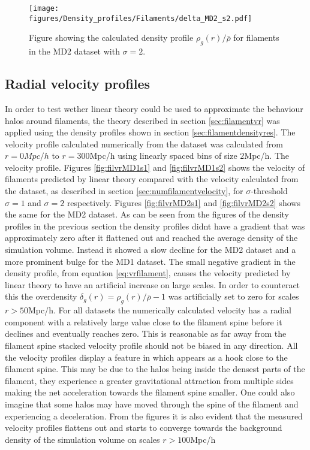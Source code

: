 \begin{figure}[H]
    \texttt{[image: figures/Density\_profiles/Filaments/delta\_MD2\_s2.pdf]}
    \caption{Figure showing the calculated density profile $\rho_g(r)/\bar{\rho}$ for filaments in the MD2 dataset with $\sigma=2$.}
    \label{fig:fildensitytMD2s2}
\end{figure}
\subsection{Radial velocity profiles}
In order to test wether linear theory could be used to approximate the behaviour halos around filaments, the theory described in section \ref{sec:filamentvr} was applied using the density profiles shown in section \ref{sec:filamentdensityres}. The velocity profile calculated numerically from the dataset was calculated from $r=0Mpc/h$ to $r=300$Mpc/h using linearly spaced bins of size $2$Mpc/h. The velocity profile. Figures \ref{fig:filvrMD1s1} and \ref{fig:filvrMD1s2} shows the velocity of filaments predicted by linear theory compared with the velocity calculated from the dataset, as described in section \ref{sec:numfilamentvelocity}, for $\sigma$-threshold $\sigma=1$ and $\sigma=2$ respectively. Figures \ref{fig:filvrMD2s1} and \ref{fig:filvrMD2s2} shows the same for the MD2 dataset. As can be seen from the figures of the density profiles in the previous section the density profiles didnt have a gradient that was approximately zero after it flattened out and reached the average density of the simulation volume. Instead it showed a slow decline for the MD2 dataset and a more prominent bulge for the MD1 dataset. The small negative gradient in the density profile, from equation \ref{eq:vrfilament}, causes the velocity predicted by linear theory to have an artificial increase on large scales. In order to counteract this the overdensity $\delta_g(r)=\rho_g(r)/\bar{\rho}-1$ was artificially set to zero for scales $r>50$Mpc/h. For all datasets the numerically calculated velocity has a radial component with a relatively large value close to the filament spine before it declines and eventually reaches zero. This is reasonable as far away from the filament spine stacked velocity profile should not be biased in any direction. All the velocity profiles display a feature in which appears as a hook close to the filament spine. This may be due to the halos being inside the densest parts of the filament, they experience a greater gravitational attraction from multiple sides making the net acceleration towards the filament spine smaller. One could also imagine that some halos may have moved through the spine of the filament and experiencing a deceleration. From the figures it is also evident that the measured velocity profiles flattens out and starts to converge towards the background density of the simulation volume on scales $r>100$Mpc/h \\\indent
